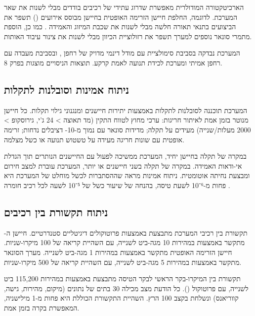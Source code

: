 הארכיטקטורה המודולרית מאפשרת שדרוג עתידי של רכיבים בודדים מבלי לשנות את שאר המערכת. לדוגמה, החלפת חיישן הזרימה האופטית בחיישן מבוסס אירועים () תשפר את הביצועים בתנאי תאורה חלשה מבלי לשנות את שכבת המיזוג והאמידה \cite{Horiuchi2005Neuromorphic}. כמו כן, הוספת מתמרי סונאר נוספים למערך תשפר את רזולוציית הכיוון מבלי לשנות את צינור עיבוד האותות.

המערכת נבדקה בסביבת סימולציית  עם מודל דינמי מדויק של רחפן , ובסביבת מעבדה עם רחפן אמיתי ומערכת לכידת תנועה  לאמת קרקע. תוצאות הניסויים מוצגות בפרק 8.

\subsection{ניתוח אמינות וסובלנות לתקלות}
\label{sec:ch07_reliability}

המערכת תוכננה לסובלנות לתקלות באמצעות יתירות חיישנים ומנגנוני גילוי תקלות. כל חיישן מנוטר בזמן אמת לאיתור חריגות: ערכי  מחוץ לטווח התקין (מד תאוצה > 24 ג'י, גירוסקופ > 2000 מעלות/שנייה) מעידים על תקלה; מדידות סונאר עם  נמוך מ-10- דציבלים נדחות; זרימה אופטית עם שונות חריגה מעידה על טשטוש תנועה או כשל מצלמה.

במקרה של תקלה בחיישן יחיד, המערכת ממשיכה לפעול עם החיישנים הנותרים תוך הגדלת אי-ודאות האמידה. במקרה של תקלה בשני חיישנים או יותר, המערכת עוברת למצב חירום ומבצעת נחיתה אוטומטית. ניתוח אמינות מראה שההסתברות לכשל מוחלט של המערכת היא פחות מ-10⁻⁶ לשעת טיסה, בהנחה של שיעור כשל של 10⁻⁵ לשעה לכל רכיב חומרה \cite{CrewAIDocs, Thrun2005ProbRobotics}.

\subsection{ניתוח תקשורת בין רכיבים}
\label{sec:ch07_communication}

תקשורת בין רכיבי המערכת מתבצעת באמצעות פרוטוקולים דיגיטליים סטנדרטיים. חיישן ה- מתקשר באמצעות  במהירות 10 מגה-ביט לשנייה, עם השהיית קריאה של 100 מיקרו-שניות. חיישן הזרימה האופטית מתקשר באמצעות  במהירות 1 מגה-ביט לשנייה. מערך הסונאר מתקשר באמצעות  במהירות 5 מגה-ביט לשנייה, עם השהיית קריאה של 500 מיקרו-שניות.

תקשורת בין המיקרו-בקר הראשי לבקר הטיסה מתבצעת באמצעות  במהירות 115,200 ביט לשנייה, עם פרוטוקול  (). כל הודעת מצב מכילה 30 בתים של נתונים (מיקום, מהירות, גישה, קווריאנס) ונשלחת בקצב 100 הרץ. השהיית התקשורת הכוללת היא פחות מ-1 מילישניה, המאפשרת בקרה בזמן אמת.

